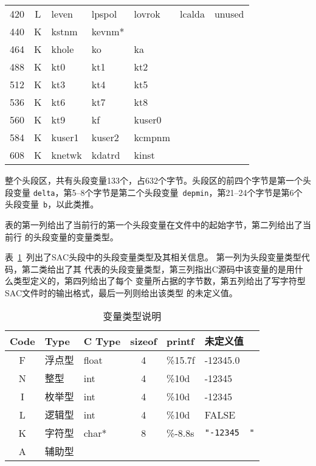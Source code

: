 \begin{table}[H]
\begin{tabular}{c|c|lllll}
	420		&	L	&	leven	&	lpspol	&	lovrok	&	lcalda	&	unused	\\
	440		&	K	&	kstnm	&	kevnm*	&			&			&			\\
	464		&	K	&	khole	&	ko		&	ka		&			&			\\
	488		&	K	&	kt0		&	kt1		&	kt2		&			&			\\
	512		&	K	&	kt3		&	kt4		&	kt5		&			&			\\
	536		&	K	&	kt6		&	kt7		&	kt8		&			&			\\
	560		&	K	&	kt9		&	kf		&	kuser0	&			&			\\
	584		&	K	&	kuser1	&	kuser2	&	kcmpnm	&			&			\\
	608		&	K	&	knetwk	&	kdatrd	&	kinst	&			&			\\
    \bottomrule
\end{tabular}
\end{table}

整个头段区，共有头段变量133个，占632个字节。头段区的前四个字节是第一个头段变量
\verb+delta+，第5--8个字节是第二个头段变量~\verb+depmin+，第21--24个字节是第6个
头段变量~\verb+b+，以此类推。

表的第一列给出了当前行的第一个头段变量在文件中的起始字节，第二列给出了当前行
的头段变量的变量类型。

表~\ref{table:header-variables-type}~列出了SAC头段中的头段变量类型及其相关信息。
第一列为头段变量类型代码，第二类给出了其
代表的头段变量类型，第三列指出C源码中该变量的是用什么类型定义的，第四列给出了每个
变量所占据的字节数，第五列给出了写字符型SAC文件时的输出格式，最后一列则给出该类型
的未定义值。

\begin{table}[H]
\caption{变量类型说明}
\label{table:header-variables-type}
\centering
\ttfamily
\small
\begin{tabular}{cllcll}
	\toprule
    Code    &	Type        &   C Type & sizeof &   printf	&   未定义值        \\
	\midrule
    F		&	浮点型		&   float  &  4     &	\%15.7f &   -12345.0        \\
    N		&	整型		&   int    &  4     &	\%10d   &   -12345        \\
    I		&	枚举型		&   int    &  4     &	\%10d   &   -12345	        \\
    L		&	逻辑型		&   int    &  4     &	\%10d   &   FALSE        \\
    K		&	字符型		&   char*  &  8     &	\%-8.8s & \lstinline[showspaces=true]{"-12345  "}     \\
    A		&	辅助型		&          &        &			& 	    \\
	\bottomrule
\end{tabular}
\end{table}

